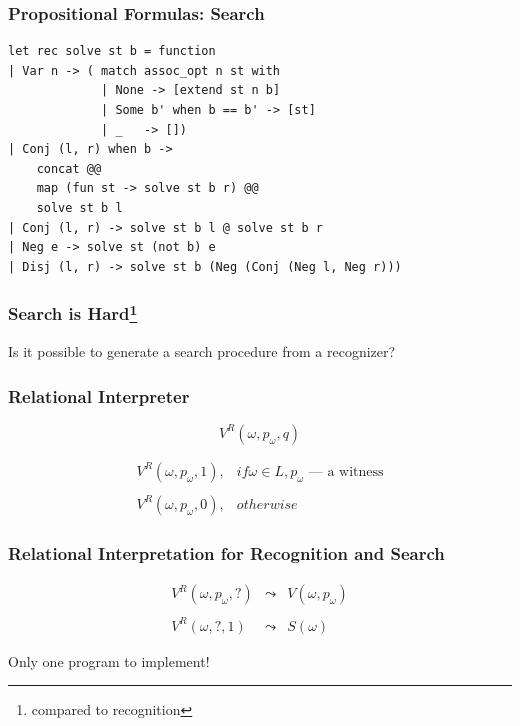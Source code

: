 \documentclass[xcolor=table]{beamer}
\begin{document}
\begin{frame}[fragile]
  \transwipe[direction=90]
  \frametitle{Propositional Formulas: Search}

\begin{lstlisting}
let rec solve st b = function
| Var n -> ( match assoc_opt n st with
             | None -> [extend st n b]
             | Some b' when b == b' -> [st]
             | _   -> [])
| Conj (l, r) when b ->
    concat @@
    map (fun st -> solve st b r) @@
    solve st b l
| Conj (l, r) -> solve st b l @ solve st b r
| Neg e -> solve st (not b) e
| Disj (l, r) -> solve st b (Neg (Conj (Neg l, Neg r)))
\end{lstlisting}
\end{frame}

\begin{frame}[fragile]
  \transwipe[direction=90]
  \frametitle{Search is Hard\footnote{compared to recognition}}
\begin{center}
Is it possible to generate a search procedure from a recognizer?
\end{center}
\end{frame}


\begin{frame}[fragile]
  \transwipe[direction=90]
  \frametitle{Relational Interpreter}
\[ V^R(\omega, p_{\omega}, q) \]

\[
\begin{array}{ll}
  V^R(\omega, p_{\omega}, 1), & if \omega \in L, p_{\omega} \text{ --- a witness} \\
  & \\
  V^R(\omega, p_{\omega}, 0), & otherwise
\end{array}
\]
\end{frame}


\begin{frame}[fragile]
  \transwipe[direction=90]
  \frametitle{Relational Interpretation for Recognition and Search}

\[
\begin{array}{rcl}
 V^R(\omega, p_{\omega}, ?) & \leadsto & V(\omega, p_{\omega}) \\
 & \\
 V^R(\omega, ?, 1) & \leadsto & S(\omega)
\end{array}
\]

\vspace*{\fill}

\begin{center} Only one program to implement! \end{center}
\end{frame}
\end{document}
